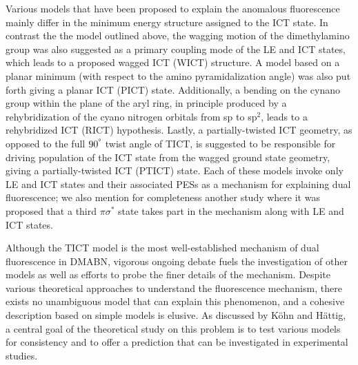 \documentclass[journal=jacsat,manuscript=article]{achemso}
\begin{document}
Various models that have been proposed to explain the anomalous fluorescence mainly differ in the minimum energy structure assigned to the ICT state.\cite{grabowski2003structural} In contrast the the model outlined above, the wagging motion of the dimethylamino group was also suggested as a primary coupling mode of the LE and ICT states, which leads to a proposed wagged ICT (WICT) structure.\cite{zachariasse1996intramolecular,zachariasse1997photo} A model based on a planar minimum (with respect to the amino pyramidalization angle) was also put forth giving a planar ICT (PICT) state.\cite{zachariasse2000comment,zachariasse2002picosecond,zachariasse2004intramolecular} Additionally, a bending on the cynano group within the plane of the aryl ring, in principle produced by a rehybridization of the cyano nitrogen orbitals from sp to sp$^2$, leads to a rehybridized ICT (RICT) hypothesis.\cite{lewis1980singlet,sobolewski1996promotion} Lastly, a partially-twisted ICT geometry, as opposed to the full $90^\degree$ twist angle of TICT, is suggested to be responsible for driving population of the ICT state from the wagged ground state geometry, giving a partially-twisted ICT (PTICT) state.\cite{coto2011intramolecular} Each of these models invoke only LE and ICT states and their associated PESs as a mechanism for explaining dual fluorescence; we also mention for completeness another study where it was proposed that a third $\pi\sigma^*$ state takes part in the mechanism along with LE and ICT states.\cite{georgieva2015intramolecular}

Although the TICT model is the most well-established mechanism of dual fluorescence in DMABN, vigorous ongoing debate fuels the investigation of other models as well as efforts to probe the finer details of the mechanism. Despite various theoretical approaches to understand the fluorescence mechanism, there exists no unambiguous model that can explain this phenomenon, and a cohesive description based on simple models is elusive.\cite{rappoport2004photoinduced} As discussed by K{\"o}hn and H{\"a}ttig, a central goal of the theoretical study on this problem is to test various models for consistency and to offer a prediction that can be investigated in experimental studies.\cite{kohn2004} 
\end{document}
